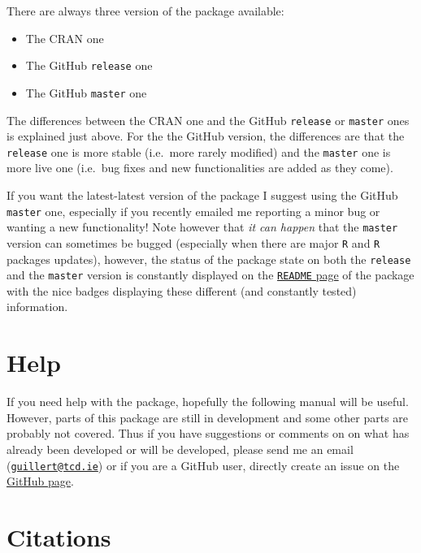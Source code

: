 \documentclass[]{book}
\providecommand{\tightlist}{%
  \setlength{\itemsep}{0pt}\setlength{\parskip}{0pt}}
\begin{document}
There are always three version of the package available:

\begin{itemize}
\tightlist
\item
  The CRAN one
\item
  The GitHub \texttt{release} one
\item
  The GitHub \texttt{master} one
\end{itemize}

The differences between the CRAN one and the GitHub \texttt{release} or \texttt{master} ones is explained just above.
For the the GitHub version, the differences are that the \texttt{release} one is more stable (i.e.~more rarely modified) and the \texttt{master} one is more live one (i.e.~bug fixes and new functionalities are added as they come).

If you want the latest-latest version of the package I suggest using the GitHub \texttt{master} one, especially if you recently emailed me reporting a minor bug or wanting a new functionality!
Note however that \emph{it can happen} that the \texttt{master} version can sometimes be bugged (especially when there are major \texttt{R} and \texttt{R} packages updates), however, the status of the package state on both the \texttt{release} and the \texttt{master} version is constantly displayed on the \href{https://github.com/TGuillerme/dispRity/}{\texttt{README} page} of the package with the nice badges displaying these different (and constantly tested) information.

\hypertarget{help}{%
\section{Help}\label{help}}

If you need help with the package, hopefully the following manual will be useful.
However, parts of this package are still in development and some other parts are probably not covered.
Thus if you have suggestions or comments on on what has already been developed or will be developed, please send me an email (\href{mailto:guillert@tcd.ie}{\nolinkurl{guillert@tcd.ie}}) or if you are a GitHub user, directly create an issue on the \href{https://github.com/TGuillerme/dispRity}{GitHub page}.

\hypertarget{citations}{%
\section{Citations}\label{citations}}
\end{document}
